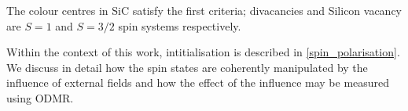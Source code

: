 The colour centres in SiC satisfy the first criteria; divacancies and Silicon vacancy are $S=1$ and $S=3/2$ spin systems respectively. 

Within the context of this work, intitialisation is described in \ref{spin_polarisation}. We discuss in detail how the spin states are coherently manipulated by the influence of external fields and how the effect of the influence may be measured using ODMR. 
%
%
%
%
%
%
%
